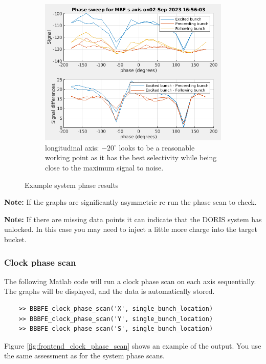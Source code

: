 \documentclass{report}
\begin{document}
\begin{figure}[hbt]
    \begin{subfigure}[b]{0.45\textwidth}
        \includegraphics[width=\textwidth]{vlr_system_phase_scan_s.png}
        \caption{longitudinal axis: $-20^\circ$ looks to be a reasonable working point as it has the best selectivity while being close to the maximum signal to noise.}
        \label{fig:frontend_system_phase_scan_z}
    \end{subfigure}
    \caption{Example system phase results}
    \label{fig:frontend_system_phase_scan}
\end{figure}
\textbf{Note: }If the graphs are significantly asymmetric re-run the phase scan to check.

\textbf{Note:} If there are missing data points it can indicate that the DORIS system has unlocked. In this case you may need to inject a little more charge into the target bucket.

\subsubsection{Clock phase scan} 
The following Matlab code will run a clock phase scan on each axis sequentially. The graphs will be displayed, and the data is automatically stored. 

\begin{verbatim}
    >> BBBFE_clock_phase_scan('X', single_bunch_location)
    >> BBBFE_clock_phase_scan('Y', single_bunch_location)
    >> BBBFE_clock_phase_scan('S', single_bunch_location)
\end{verbatim}
Figure \ref{fig:frontend_clock_phase_scan} shows an example of the output. You use the same assessment as for the system phase scans.
\end{document}
